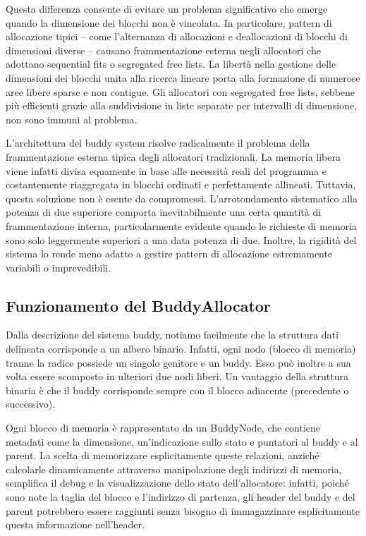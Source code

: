 Questa differenza consente di evitare un problema significativo che emerge quando la dimensione dei blocchi non è vincolata. In particolare, pattern di allocazione tipici – come l'alternanza di allocazioni e deallocazioni di blocchi di dimensioni diverse – causano frammentazione esterna negli allocatori che adottano sequential fits o segregated free lists. La libertà nella gestione delle dimensioni dei blocchi unita alla ricerca lineare porta alla formazione di numerose aree libere sparse e non contigue. Gli allocatori con segregated free lists, sebbene più efficienti grazie alla suddivisione in liste separate per intervalli di dimensione, non sono immuni al problema.

L’architettura del buddy system risolve radicalmente il problema della frammentazione esterna tipica degli allocatori tradizionali. La memoria libera viene infatti divisa equamente in base alle necessità reali del programma e costantemente riaggregata in blocchi ordinati e perfettamente allineati. Tuttavia, questa soluzione non è esente da compromessi. L'arrotondamento sistematico alla potenza di due superiore comporta inevitabilmente una certa quantità di frammentazione interna, particolarmente evidente quando le richieste di memoria sono solo leggermente superiori a una data potenza di due. Inoltre, la rigidità del sistema lo rende meno adatto a gestire pattern di allocazione estremamente variabili o imprevedibili.

\subsection*{Funzionamento del BuddyAllocator}
Dalla descrizione del sistema buddy, notiamo facilmente che la struttura dati delineata corrisponde a un albero binario. Infatti, ogni nodo (blocco di memoria) tranne la radice possiede un singolo genitore e un buddy. Esso può inoltre a sua volta essere scomposto in ulteriori due nodi liberi. Un vantaggio della struttura binaria è che il buddy corrisponde sempre con il blocco adiacente (precedente o successivo).

Ogni blocco di memoria è rappresentato da un BuddyNode, che contiene metadati come la dimensione, un’indicazione sullo stato e puntatori al buddy e al parent. La scelta di memorizzare esplicitamente queste relazioni, anziché calcolarle dinamicamente attraverso manipolazione degli indirizzi di memoria, semplifica il debug e la visualizzazione dello stato dell'allocatore: infatti, poiché sono note la taglia del blocco e l’indirizzo di partenza, gli header del buddy e del parent potrebbero essere raggiunti senza bisogno di immagazzinare esplicitamente questa informazione nell’header.

